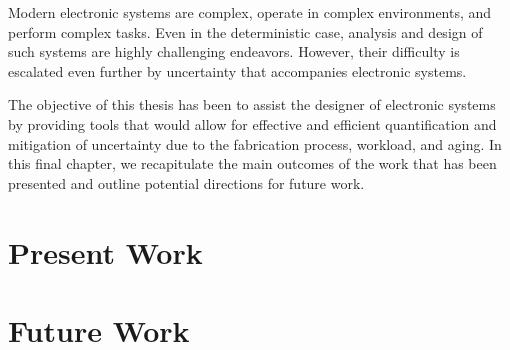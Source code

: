 Modern electronic systems are complex, operate in complex environments, and
perform complex tasks. Even in the deterministic case, analysis and design of
such systems are highly challenging endeavors. However, their difficulty is
escalated even further by uncertainty that accompanies electronic systems.

The objective of this thesis has been to assist the designer of electronic
systems by providing tools that would allow for effective and efficient
quantification and mitigation of uncertainty due to the fabrication process,
workload, and aging. In this final chapter, we recapitulate the main outcomes of
the work that has been presented and outline potential directions for future
work.

\section{Present Work}

\section{Future Work}
